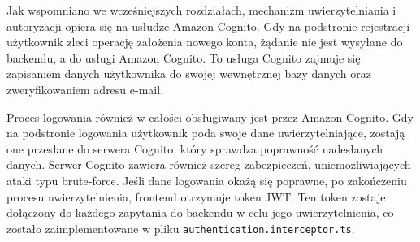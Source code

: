 Jak wspomniano we wcześniejszych rozdziałach, mechanizm uwierzytelniania i autoryzacji opiera się na usłudze Amazon Cognito. Gdy na podstronie rejestracji użytkownik zleci operację założenia nowego konta, żądanie nie jest wysyłane do backendu, a do usługi Amazon Cognito. To usługa Cognito zajmuje się zapisaniem danych użytkownika do swojej wewnętrznej bazy danych oraz zweryfikowaniem adresu e-mail.

Proces logowania również w całości obsługiwany jest przez Amazon Cognito. Gdy na podstronie logowania użytkownik poda swoje dane uwierzytelniające, zostają one przesłane do serwera Cognito, który sprawdza poprawność nadesłanych danych. Serwer Cognito zawiera również szereg zabezpieczeń, uniemożliwiających ataki typu brute-force. Jeśli dane logowania okażą się poprawne, po zakończeniu procesu uwierzytelnienia, frontend otrzymuje token JWT. Ten token zostaje dołączony do każdego zapytania do backendu w celu jego uwierzytelnienia, co zostało zaimplementowane w pliku \texttt{authentication.interceptor.ts}.

